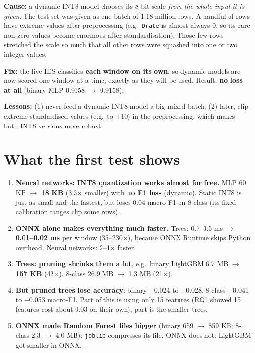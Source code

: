 \documentclass[11pt]{article}
\begin{document}
\textbf{Cause:} a dynamic INT8 model chooses its 8-bit scale \emph{from the whole input it is given}. The test set was given as one batch of 1.18 million rows.
A handful of rows have extreme values after preprocessing (e.g.\ \texttt{Drate} is almost always 0, so its rare non-zero values become enormous after
standardisation). Those few rows stretched the scale so much that all other rows were squashed into one or two integer values.

\textbf{Fix:} the live IDS classifies \textbf{each window on its own}, so dynamic models are now scored one window at a time, exactly as they will be used.
Result: \textbf{no loss at all} (binary MLP 0.9158 $\rightarrow$ 0.9158).

\textbf{Lessons:} (1) never feed a dynamic INT8 model a big mixed batch; (2) later, clip extreme standardised values (e.g.\ to $\pm$10) in the
preprocessing, which makes both INT8 versions more robust.

\section{What the first test shows}
\begin{enumerate}
\item \textbf{Neural networks: INT8 quantization works almost for free.} MLP 60 KB $\rightarrow$ \textbf{18 KB} (3.3$\times$ smaller) with \textbf{no F1 loss}
(dynamic). Static INT8 is just as small and the fastest, but loses 0.04 macro-F1 on 8-class (its fixed calibration ranges clip some rows).
\item \textbf{ONNX alone makes everything much faster.} Trees: 0.7--3.5 ms $\rightarrow$ \textbf{0.01--0.02 ms} per window (35--230$\times$), because ONNX Runtime
skips Python overhead. Neural networks: 2--4$\times$ faster.
\item \textbf{Trees: pruning shrinks them a lot}, e.g.\ binary LightGBM 6.7 MB $\rightarrow$ \textbf{157 KB} (42$\times$), 8-class 26.9 MB $\rightarrow$ 1.3 MB (21$\times$).
\item \textbf{But pruned trees lose accuracy}: binary $-$0.024 to $-$0.028, 8-class $-$0.041 to $-$0.053 macro-F1. Part of this is using only 15 features
(RQ1 showed 15 features cost about 0.03 on their own), part is the smaller trees.
\item \textbf{ONNX made Random Forest files bigger} (binary 659 $\rightarrow$ 859 KB; 8-class 2.3 $\rightarrow$ 4.0 MB): \texttt{joblib} compresses its file,
ONNX does not. LightGBM got smaller in ONNX.
\end{enumerate}
\end{document}
